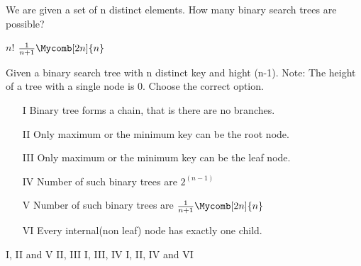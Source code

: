 \begin{questyle}
  \question  We are given a set of n distinct elements. How many binary search trees are possible?

  \begin{oneparchoices}
    \choice         \( {n!} \)
    \CorrectChoice  \( \frac{1}{n+1} \Mycomb[2n]{n} \)
  \end{oneparchoices}
\end{questyle}


\begin{questyle}
  \question Given a binary search tree with n distinct key and hight (n-1). Note: The height
            of a tree with a single node is 0. Choose the correct option.
    \begin{enumerate}
    \item[I]  Binary tree forms a chain, that is there are no branches.
    \item[II] Only maximum or the minimum key can be the root node.
    \item[III] Only maximum or the minimum key can be the leaf node.
    \item[IV] Number of such binary trees are \( 2^(n-1)\)
    \item[V] Number of such binary trees are \( \frac{1}{n+1} \Mycomb[2n]{n} \)
    \item[VI] Every internal(non leaf) node has exactly one child.
    \end{enumerate}

  \begin{oneparchoices}
    \choice         I, II and V
    \choice         II, III
    \choice         I, III, IV
    \CorrectChoice  I, II, IV and VI
  \end{oneparchoices}
\end{questyle}
